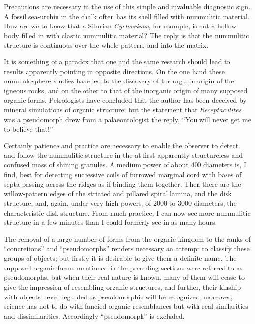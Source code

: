 \documentclass[a4paper, 12pt, oneside]{article}
\begin{document}
Precautions are necessary in the use of this simple and invaluable diagnostic sign. A fossil sea-urchin in the chalk often has its shell filled with nummulitic material. How are we to know that a Silurian \emph{Cyclocrinus}, for example, is not a hollow body filled in with clastic nummulitic material? The reply is that the nummulitic structure is continuous over the whole pattern, and into the matrix.

It is something of a paradox that one and the same research should lead to results apparently pointing in opposite directions. On the one hand these nummulosphere studies have led to the discovery of the organic origin of the igneous rocks, and on the other to that of the inorganic origin of many supposed organic forms. Petrologists have concluded that the author has been deceived by mineral simulations of organic structure; but the statement that \emph{Receptaculites} was a pseudomorph drew from a palaeontologist the reply, ``You will never get me to believe that!''

Certainly patience and practice are necessary to enable the observer to detect and follow the nummulitic structure in the at first apparently structureless and confused mass of shining granules. A medium power of about 400 diameters is, I find, best for detecting successive coils of furrowed marginal cord with bases of septa passing across the ridges as if binding them together. Then there are the willow-pattern edges of the striated and pillared spiral lamina, and the disk structure; and, again, under very high powers, of 2000 to 3000 diameters, the characteristic disk structure. From much practice, I can now see more nummulitic structure in a few minutes than I could formerly see in as many hours.

The removal of a large number of forms from the organic kingdom to the ranks of ``concretions'' and ``pseudomorphs'' renders necessary an attempt to classify these groups of objects; but firstly it is desirable to give them a definite name. The supposed organic forms mentioned in the preceding sections were referred to as pseudomorphs, but when their real nature is known, many of them will cease to give the impression of resembling organic structures, and further, their kinship with objects never regarded as pseudomorphic will be recognized; moreover, science has not to do with fancied organic resemblances but with real similarities and dissimilarities. Accordingly ``pseudomorph'' is excluded.
\end{document}
